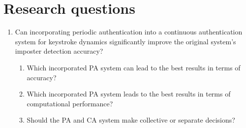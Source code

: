 \documentclass[informationsecurity]{gucmasterproject}
\begin{document}
\section{Research questions}\label{research:questions}
\begin{enumerate}
\item Can incorporating periodic authentication into a continuous authentication system for keystroke
dynamics significantly improve the original system's imposter detection accuracy?
\begin{enumerate}
\item Which incorporated PA system can lead to the best results in terms of accuracy?
\item Which incorporated PA system leads to the best results in terms of computational performance?

\item Should the PA and CA system make collective or separate decisions?
\end{enumerate}
\end{enumerate}
%
\end{document}

